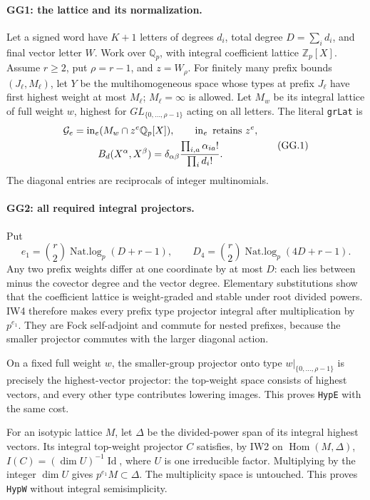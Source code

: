 \documentclass[11pt,a4paper]{article}
\numberwithin{equation}{section}
\theoremstyle{remark}\newtheorem{remark}[theorem]{Remark}
\begin{document}
\paragraph{GG1: the lattice and its normalization.}
Let a signed word have $K+1$ letters of degrees $d_i$, total degree
$D=\sum_i d_i$, and final vector letter $W$. Work over $\mathbb Q_p$,
with integral coefficient lattice $\mathbb Z_p[X]$.
Assume $r\ge2$, put $\rho=r-1$, and $z=W_\rho$.
For finitely many prefix bounds $(J_\ell,M_\ell)$, let $Y$ be the
multihomogeneous space whose types at prefix $J_\ell$ have first
highest weight at most $M_\ell$; $M_\ell=\infty$ is allowed.
Let $M_w$ be its integral lattice of full weight $w$, highest for
$GL_{\{0,\ldots,\rho-1\}}$ acting on all letters. The literal
\texttt{grLat} is
\[
 \begin{gathered}
 {\cal G}_e=\operatorname{in}_e(M_w\cap z^e\mathbb Q_p[X]),\qquad
 \operatorname{in}_e\text{ retains }z^e,\\
 B_d(X^\alpha,X^\beta)=
 \delta_{\alpha\beta}\frac{\prod_{i,a}\alpha_{ia}!}{\prod_i d_i!}.
 \end{gathered}
                                                               \tag{GG.1}
\]
The diagonal entries are reciprocals of integer multinomials.

\paragraph{GG2: all required integral projectors.}
Put
\[
 e_1=\binom r2\operatorname{Nat.log}_p(D+r-1),\qquad
 D_4=\binom r2\operatorname{Nat.log}_p(4D+r-1).                  \tag{GG.2}
\]
Any two prefix weights differ at one coordinate by at most $D$:
each lies between minus the covector degree and the vector degree.
Elementary substitutions show that the coefficient lattice is
weight-graded and stable under root divided powers. IW4 therefore
makes every prefix type projector integral after multiplication by
$p^{e_1}$. They are Fock self-adjoint and commute for nested prefixes,
because the smaller projector commutes with the larger diagonal action.

On a fixed full weight $w$, the smaller-group projector onto type
$w|_{\{0,\ldots,\rho-1\}}$ is precisely the highest-vector projector:
the top-weight space consists of highest vectors, and every other
type contributes lowering images. This proves \texttt{HypE} with the
same cost.

For an isotypic lattice $M$, let $\Delta$ be the divided-power span
of its integral highest vectors. Its integral top-weight projector
$C$ satisfies, by IW2 on $\operatorname{Hom}(M,\Delta)$,
$I(C)=(\dim U)^{-1}\operatorname{Id}$, where $U$ is one irreducible
factor. Multiplying by the integer $\dim U$ gives
$p^{e_1}M\subset\Delta$. The multiplicity space is untouched.
This proves \texttt{HypW} without integral semisimplicity.
\end{document}
